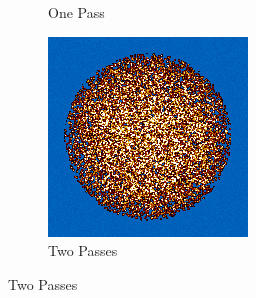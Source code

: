 \begin{figure}
\begin{subfigure}{0.25\textwidth}
  \caption{One Pass}
  \label{fig:bstep1}
\end{subfigure}%
%
\begin{subfigure}{0.25\textwidth}
  \includegraphics[width=0.95\linewidth]{figures/burn-20-bstep2}
  \caption{Two Passes}
  \label{fig:bstep2}
\end{subfigure}%


\end{figure}
